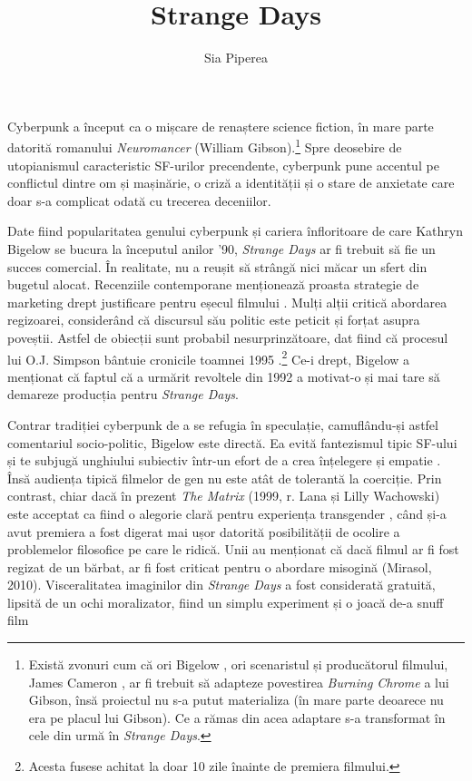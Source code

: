 \documentclass[12pt]{article}
\title{Strange Days}
\author{Sia Piperea}
\begin{document}
	 	
\maketitle
	 	
Cyberpunk a început ca o mișcare de renaștere science fiction, în mare parte datorită romanului \textit{Neuromancer} (William Gibson).\footnote{Există zvonuri cum că ori Bigelow \parencite{Salza1994a}, ori scenaristul și producătorul filmului, James Cameron \parencite{Henry2023a}, ar fi trebuit să adapteze povestirea \textit{Burning Chrome} a lui Gibson, însă proiectul nu s-a putut materializa (în mare parte deoarece nu era pe placul lui Gibson). Ce a rămas din acea adaptare s-a transformat în cele din urmă în \textit{Strange Days}.} Spre deosebire de utopianismul caracteristic SF-urilor precendente, cyberpunk pune accentul pe conflictul dintre om și mașinărie, o criză a identității și o stare de anxietate care doar s-a complicat odată cu trecerea deceniilor.\par

Date fiind popularitatea genului cyberpunk și cariera înfloritoare de care Kathryn Bigelow se bucura la începutul anilor '90, \textit{Strange Days} ar fi trebuit să fie un succes comercial. În realitate, nu a reușit să strângă nici măcar un sfert din bugetul alocat. Recenziile contemporane menționează proasta strategie de marketing drept justificare pentru eșecul filmului \parencite{McCarthy1995a}. Mulți alții critică abordarea regizoarei, considerând că discursul său politic este peticit și forțat asupra poveștii. Astfel de obiecții sunt probabil nesurprinzătoare, dat fiind că procesul lui O.J. Simpson bântuie cronicile toamnei 1995 \parencite{Willistein1995a}.\footnote{Acesta fusese achitat la doar 10 zile înainte de premiera filmului.} Ce-i drept, Bigelow a menționat că faptul că a urmărit revoltele din 1992 a motivat-o și mai tare să demareze producția pentru \textit{Strange Days}.\par

Contrar \dedouble tradiției \sqtworight cyberpunk de a se refugia în speculație, camuflându-și astfel comentariul socio-politic, Bigelow este directă. Ea evită fantezismul tipic SF-ului și te subjugă unghiului subiectiv într-un efort de a crea înțelegere și empatie \parencite{Ebert1995a}. Însă audiența tipică filmelor de gen nu este atât de tolerantă la coerciție. Prin contrast, chiar dacă în prezent \textit{The Matrix} (1999, r. Lana și Lilly Wachowski) este acceptat ca fiind o alegorie clară pentru experiența transgender , când și-a avut premiera a fost digerat mai ușor datorită posibilității de ocolire a problemelor filosofice pe care le ridică. Unii au menționat că dacă filmul ar fi fost regizat de un bărbat, ar fi fost criticat pentru o abordare misogină \parencite{} (Mirasol, 2010). Visceralitatea imaginilor din \textit{Strange Days} a fost considerată gratuită, lipsită de un ochi moralizator, fiind un simplu experiment și o joacă de-a snuff film \parencite{Guthmann1995a} %
\end{document}
